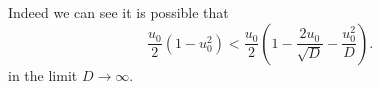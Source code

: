 \documentclass[a4paper, 12pt]{article}
\begin{document}
\begin{enumerate}[label={\bf \arabic{*}.\;}, ref={\arabic{*}},itemsep=3ex, left=0ex]
{\begin{enumerate}[label=(\alph*)]
{              Indeed we can see it is possible that
              \begin{equation}
                \frac{u_0}{2}\left(1-u_0^2\right) <  \frac{u_0}{2}\left(1-\frac{2u_0}{\sqrt{D}} -\frac{u_0^2}{D}\right).
              \end{equation}
              in the limit $D\to \infty$.
            }
        \end{enumerate}

      }
  \end{enumerate}
  
\end{document}
